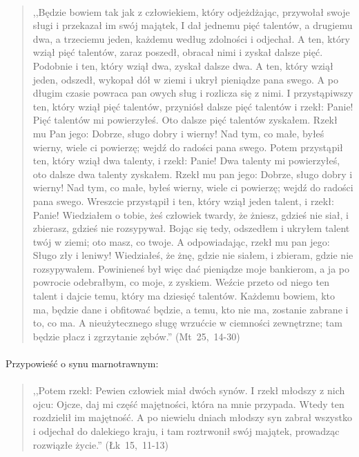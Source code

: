 \documentclass[10pt,a4paper,oneside]{article}
\begin{document}
\paragraph{}
\begin{quote}
,,Będzie bowiem tak jak z człowiekiem, który odjeżdżając, przywołał swoje sługi i przekazał im swój majątek, I dał jednemu pięć talentów, a drugiemu dwa, a trzeciemu jeden, każdemu według zdolności i odjechał. A ten, który wziął pięć talentów, zaraz poszedł, obracał nimi i zyskał dalsze pięć. Podobnie i ten, który wziął dwa, zyskał dalsze dwa. A ten, który wziął jeden, odszedł, wykopał dół w ziemi i ukrył pieniądze pana swego. A po długim czasie powraca pan owych sług i rozlicza się z nimi. I przystąpiwszy ten, który wziął pięć talentów, przyniósł dalsze pięć talentów i rzekł: Panie! Pięć talentów mi powierzyłeś. Oto dalsze pięć talentów zyskałem. Rzekł mu Pan jego: Dobrze, sługo dobry i wierny! Nad tym, co małe, byłeś wierny, wiele ci powierzę; wejdź do radości pana swego. Potem przystąpił ten, który wziął dwa talenty, i rzekł: Panie! Dwa talenty mi powierzyłeś, oto dalsze dwa talenty zyskałem. Rzekł mu pan jego: Dobrze, sługo dobry i wierny! Nad tym, co małe, byłeś wierny, wiele ci powierzę; wejdź do radości pana swego. Wreszcie przystąpił i ten, który wziął jeden talent, i rzekł: Panie! Wiedziałem o tobie, żeś człowiek twardy, że żniesz, gdzieś nie siał, i zbierasz, gdzieś nie rozsypywał. Bojąc się tedy, odszedłem i ukryłem talent twój w ziemi; oto masz, co twoje. A odpowiadając, rzekł mu pan jego: Sługo zły i leniwy! Wiedziałeś, że żnę, gdzie nie siałem, i zbieram, gdzie nie rozsypywałem. Powinieneś był więc dać pieniądze moje bankierom, a ja po powrocie odebrałbym, co moje, z zyskiem. Weźcie przeto od niego ten talent i dajcie temu, który ma dziesięć talentów. Każdemu bowiem, kto ma, będzie dane i obfitować będzie, a temu, kto nie ma, zostanie zabrane i to, co ma. A nieużytecznego sługę wrzućcie w ciemności zewnętrzne; tam będzie płacz i zgrzytanie zębów.'' \mbox{(Mt 25, 14-30)}
\end{quote}
\paragraph{}
Przypowieść o synu marnotrawnym:
\paragraph{}
\begin{quote}
,,Potem rzekł: Pewien człowiek miał dwóch synów. I rzekł młodszy z nich ojcu: Ojcze, daj mi część majętności, która na mnie przypada. Wtedy ten rozdzielił im majętność. A po niewielu dniach młodszy syn zabrał wszystko i odjechał do dalekiego kraju, i tam roztrwonił swój majątek, prowadząc rozwiązłe życie.'' \mbox{(Łk 15, 11-13)}
\end{quote}
\end{document}
